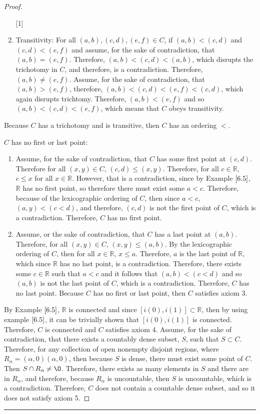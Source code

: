 \documentclass[openany, amssymb, psamsfonts]{amsart}
\newcommand{\bbR}{\mathbb{R}}
\renewcommand{\emptyset}{\O}
\theoremstyle{definition}
\numberwithin{equation}{section}
\begin{document}
\begin{proof}
\begin{enumerate} [1]
\begin{enumerate}
\end{enumerate}
\item Transitivity: For all $(a,b), (c,d), (e,f) \in C$, if $(a,b)<(c,d)$ and $(c,d) < (e,f)$ and assume, for the sake of contradiction, that $(a,b) = (e,f)$. Therefore, $(a,b) < (c,d) < (a,b)$, which disrupts the trichotomy in $C$, and therefore, is a contradiction. Therefore, $(a,b)\neq (e,f)$. Assume, for the sake of contradiction, that $(a,b)> (e,f)$, therefore, $(a,b)<(c,d)<(e,f)<(c,d)$, which again disrupts trichtomy. Therefore, $(a,b)<(e,f)$ and so $(a,b)<(c,d)<(e,f)$, which means that $C$ obeys transitivity.  
\end{enumerate}
Because $C$ has a trichotomy and is transitive, then $C$ has an ordering $<$.
\item $C$ has no first or last point:
\begin{enumerate}
\item Assume, for the sake of contradiction, that $C$ has some first point at $(c,d)$. Therefore for all $(x,y)\in C$, $(c,d)\leq (x,y)$. Therefore, for all $c\in \bbR$, $c\leq x$ for all $x\in \bbR$. However, that is a contradiction, since by Example $\ref{6.5}$, $\bbR$ has no first point, so therefore there must exist some $a<c$. Therefore, because of the lexicographic ordering of $C$, then since $a<c$, $(a,y)<(c<d)$, and therefore, $(c,d)$ is not the first point of $C$, which is a contradiction. Therefore, $C$ has no first point. 
\item  Assume, or the sake of contradiction, that $C$ has a last point at $(a,b)$. Therefore, for all $(x,y)\in C$, $(x,y)\leq (a,b)$. By the lexicographic ordering of $C$, then for all $x\in \bbR$, $x\leq a$. Therefore, $a$ is the last point of $\bbR$, which since $\bbR$ has no last point, is a contradiction. Therefore, there exists some $c\in \bbR$ such that $a<c$ and it follows that $(a,b)<(c<d)$ and so $(a,b)$ is not the last point of $C$, which is a contradiction. Therefore, $C$ has no last point. 
Because $C$ has no first or last point, then $C$ satisfies axiom 3.
\end{enumerate}
By Example $\ref{6.5}$, $\bbR$ is connected and since $[i(0), i(1)] \subset \bbR$, then by using example $\ref{6.5}$, it can be trivially shown that $[i(0), i(1)]$ is connected. Therefore, $C$ is connected and $C$ satisfies axiom 4.
Assume, for the sake of contradiction, that there exists a countably dense subset, $S$, such that $S\subset C$. Therefore, for any collection of open nonempty disjoint regions, where $R_\alpha = (\alpha,0)(\alpha,0)$, then because $S$ is dense, there must exist some point of $C$. Then $S \cap R_\alpha \neq \emptyset$. Therefore, there exists as many elements in $S$ and there are in ${R_\alpha}$, and therefore, because $R_\alpha$ is uncountable, then $S$ is uncountable, which is a contradiction. Therefore, $C$ does not contain a countable dense subset, and so it does not satisfy axiom 5.
\end{proof}\vspace{4pt}     \hrule   \vspace{4pt}
\end{document}
